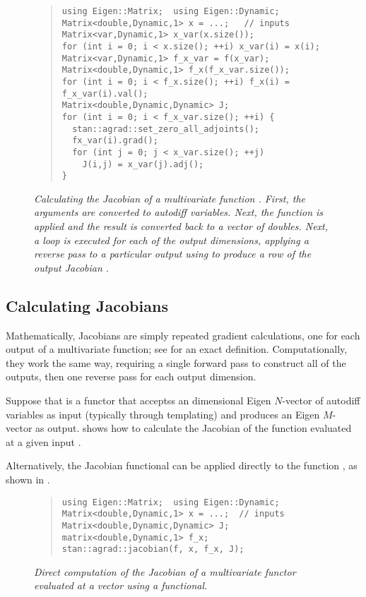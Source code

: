 \documentclass[10pt]{article}
\begin{document}
\begin{figure}
\begin{quote}\small
\begin{Verbatim}
using Eigen::Matrix;  using Eigen::Dynamic;
Matrix<double,Dynamic,1> x = ...;   // inputs
Matrix<var,Dynamic,1> x_var(x.size());
for (int i = 0; i < x.size(); ++i) x_var(i) = x(i);
Matrix<var,Dynamic,1> f_x_var = f(x_var);
Matrix<double,Dynamic,1> f_x(f_x_var.size());
for (int i = 0; i < f_x.size(); ++i) f_x(i) = f_x_var(i).val();
Matrix<double,Dynamic,Dynamic> J;
for (int i = 0; i < f_x_var.size(); ++i) {
  stan::agrad::set_zero_all_adjoints();
  fx_var(i).grad();
  for (int j = 0; j < x_var.size(); ++j)
    J(i,j) = x_var(j).adj();
}
\end{Verbatim}
\end{quote}
\vspace*{-12pt}
\caption{\small\it Calculating the Jacobian of a multivariate function .
  First, the arguments are converted to autodiff variables.  Next, the
  function is applied and the result is converted back to a vector of
  doubles.  Next, a loop is executed for each of the output
  dimensions, applying a reverse pass to a particular output using
   to produce a row of the output Jacobian
  .}\label{direct-jacobian.figure}
\end{figure}
%

\subsection{Calculating Jacobians}

Mathematically, Jacobians are simply repeated gradient calculations,
one for each output of a multivariate function; see
 for an exact definition.
Computationally, they work the same way, requiring a single forward
pass to construct all of the outputs, then one reverse pass for each
output dimension.

Suppose that  is a functor that acceptss an dimensional Eigen
$N$-vector of autodiff variables as input (typically through
templating) and produces an Eigen $M$-vector as output.
 shows how to calculate the Jacobian of the
function evaluated at a given input .

Alternatively, the Jacobian functional can be applied directly to the
function , as shown in .
%
\begin{figure}
\begin{quote}\small
\begin{Verbatim}
using Eigen::Matrix;  using Eigen::Dynamic;
Matrix<double,Dynamic,1> x = ...;  // inputs
Matrix<double,Dynamic,Dynamic> J;
matrix<double,Dynamic,1> f_x;
stan::agrad::jacobian(f, x, f_x, J);
\end{Verbatim}
\end{quote}
\vspace*{-12pt}
\caption{\small\it Direct computation of the Jacobian of a multivariate functor
   evaluated at a vector  using a
  functional.}\label{functional-jacobian.figure}
\end{figure}
\end{document}
